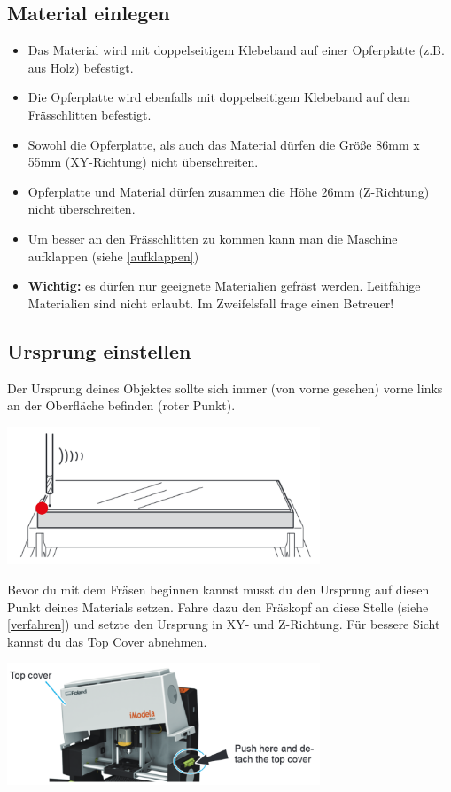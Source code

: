 \documentclass{\basedir/fablab-document}
\begin{document}
\subsection{Material einlegen}
\begin{itemize}
	\item Das Material wird mit doppelseitigem Klebeband auf einer Opferplatte (z.B. aus Holz) befestigt.
	\item Die Opferplatte wird ebenfalls mit doppelseitigem Klebeband auf dem Frässchlitten befestigt.
	\item Sowohl die Opferplatte, als auch das Material dürfen die Größe 86mm x 55mm (XY-Richtung) nicht überschreiten.
	\item Opferplatte und Material dürfen zusammen die Höhe 26mm  (Z-Richtung) nicht überschreiten.
	\item Um besser an den Frässchlitten zu kommen kann man die Maschine aufklappen (siehe \ref{aufklappen})
	\item \textbf{Wichtig:} es dürfen nur geeignete Materialien gefräst werden. Leitfähige Materialien sind nicht erlaubt. Im Zweifelsfall frage einen Betreuer! 
\end{itemize}

\subsection{Ursprung einstellen}
Der Ursprung deines Objektes sollte sich immer (von vorne gesehen) vorne links an der Oberfläche befinden (roter Punkt). 
\begin{center}
\includegraphics[width=0.7\textwidth]{img/nullpunkt}
\end{center}
Bevor du mit dem Fräsen beginnen kannst musst du den Ursprung auf diesen Punkt deines Materials setzen. Fahre dazu den Fräskopf an diese Stelle (siehe \ref{verfahren}) und setzte den Ursprung in XY- und Z-Richtung.  Für bessere Sicht kannst du das Top Cover abnehmen.
\begin{center}
\includegraphics[width=0.7\textwidth]{img/topcover}
\end{center}
\end{document}
